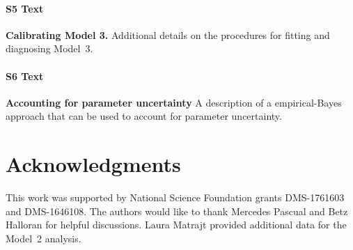 \documentclass[10pt,letterpaper]{article}\usepackage[]{graphicx}\usepackage[table]{xcolor}
\begin{document}
\paragraph*{S5 Text}
\label{S_mod3cal}
{\bf Calibrating Model 3.} Additional details on the procedures for fitting and diagnosing Model~3.

\paragraph*{S6 Text}
\label{S_uncertain}
{\bf Accounting for parameter uncertainty} A description of a empirical-Bayes approach that can be used to account for parameter uncertainty.

\paragraph*{}
\label{S_CI}
{\bf {}} 

\section*{Acknowledgments}

This work was supported by National Science Foundation grants DMS-1761603 and DMS-1646108.
The authors would like to thank Mercedes Pascual and Betz Halloran for helpful discussions. Laura Matrajt provided additional data for the Model~2 analysis.

\nolinenumbers


\end{document}
